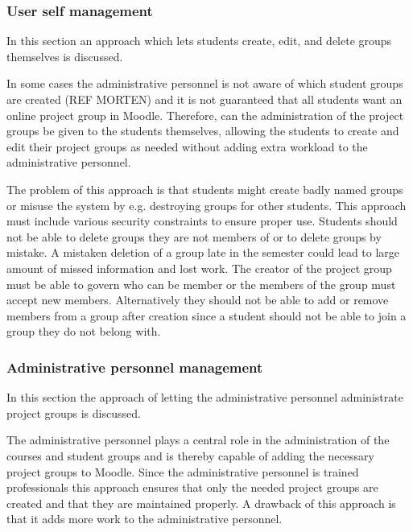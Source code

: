  


\subsubsection{User self management}
In this section an approach which lets students create, edit, and delete groups themselves is discussed. 

In some cases the administrative personnel is not aware of which student groups are created (REF MORTEN) and it is not guaranteed that all students want an online project group in Moodle. 
Therefore, can the administration of the project groups be given to the students themselves, allowing the students to create and edit their project groups as needed without adding extra workload to the administrative personnel.

The problem of this approach is that students might create badly named groups or misuse the system by e.g. destroying groups for other students. 
This approach must include various security constraints to ensure proper use. 
Students should not be able to delete groups they are not members of or to delete groups by mistake. 
A mistaken deletion of a group late in the semester could lead to large amount of missed information and lost work. 
The creator of the project group must be able to govern who can be member or the members of the group must accept new members.
Alternatively they should not be able to add or remove members from a group after creation since a student should not be able to join a group they do not belong with. 





\subsubsection{Administrative personnel management}
In this section the approach of letting the administrative personnel administrate project groups is discussed. 

The administrative personnel plays a central role in the administration of the courses and student groups and is thereby capable of adding the necessary project groups to Moodle. 
Since the administrative personnel is trained professionals this approach ensures that only the needed project groups are created and that they are maintained properly. 
A drawback of this approach is that it adds more work to the administrative personnel. 


